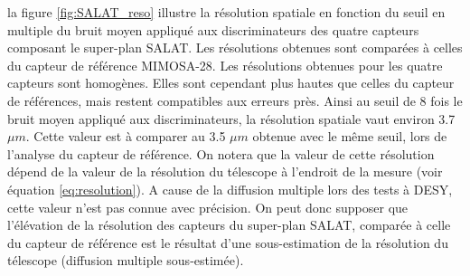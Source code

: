   
  \medskip
   
  la figure \ref{fig:SALAT_reso} illustre la r\'esolution spatiale en fonction du seuil en multiple du bruit moyen appliqu\'e aux discriminateurs des quatre capteurs composant le super-plan SALAT. Les r\'esolutions obtenues sont compar\'ees \`a celles du capteur de r\'ef\'erence MIMOSA-28. Les r\'esolutions obtenues pour les quatre capteurs sont homog\`enes. Elles sont cependant plus hautes que celles du capteur de r\'ef\'erences, mais restent compatibles aux erreurs pr\`es. Ainsi au seuil de 8 fois le bruit moyen appliqu\'e aux discriminateurs, la r\'esolution spatiale vaut environ 3.7 $\mu m$. Cette valeur est \`a comparer au 3.5 $\mu m$ obtenue avec le m\^eme seuil, lors de l'analyse du capteur de r\'ef\'erence. On notera que la valeur de cette r\'esolution d\'epend de la valeur de la r\'esolution du t\'elescope \`a l'endroit de la mesure (voir \'equation \ref{eq:resolution}). A cause de la diffusion multiple lors des tests \`a DESY, cette valeur n'est pas connue avec pr\'ecision. On peut donc supposer que l'\'el\'evation de la r\'esolution des capteurs du super-plan SALAT, compar\'ee \`a celle du capteur de r\'ef\'erence est le r\'esultat d'une sous-estimation de la r\'esolution du t\'elescope (diffusion multiple sous-estim\'ee).
  
   \medskip
   
